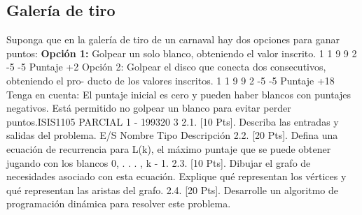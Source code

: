 \subsection{Galería de tiro}
Suponga que en la galería de tiro de un carnaval hay dos opciones para ganar
puntos:
\textbf{Opción 1:} Golpear un solo blanco, obteniendo el valor inscrito.
1
1
9
9
2
-5
-5
Puntaje +2
Opción 2: Golpear el disco que conecta dos consecutivos, obteniendo el pro-
ducto de los valores inscritos.
1
1
9
9
2
-5
-5
Puntaje +18
Tenga en cuenta: El puntaje inicial es cero y pueden haber blancos con
puntajes negativos. Está permitido no golpear un blanco para evitar perder
puntos.ISIS1105
PARCIAL 1 - 199320
3
2.1. [10 Pts]. Describa las entradas y salidas del problema.
E/S
Nombre
Tipo
Descripción
2.2. [20 Pts]. Defina una ecuación de recurrencia para L(k), el máximo puntaje
que se puede obtener jugando con los blancos 0, . . . , k - 1.
2.3. [10 Pts]. Dibujar el grafo de necesidades asociado con esta ecuación. Explique
qué representan los vértices y qué representan las aristas del grafo.
2.4. [20 Pts]. Desarrolle un algoritmo de programación dinámica para resolver
este problema.
